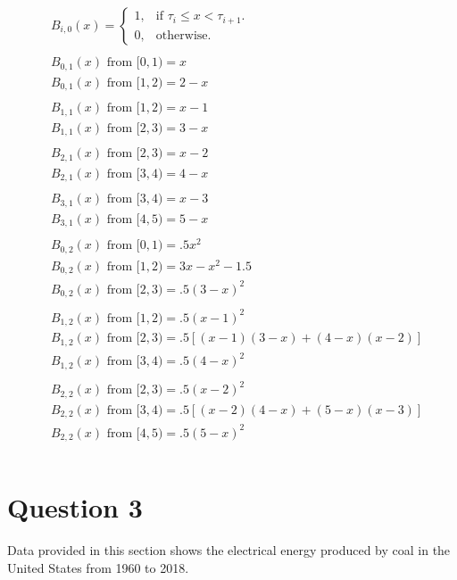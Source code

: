 \documentclass[12pt,letterpaper]{article}
\begin{document}
\begin{align*}
&B_{i,0}(x)=\begin{cases}
    1, & \text{if $\tau_i\leq x < \tau_{i+1}$}.\\
    0, & \text{otherwise}.
\end{cases}
\\ \\
&B_{0,1}(x)\mbox{ from } [0,1) = x \\
&B_{0,1}(x)\mbox{ from } [1,2) = 2-x \\ \\
&B_{1,1}(x)\mbox{ from } [1,2) = x-1 \\
&B_{1,1}(x)\mbox{ from } [2,3) = 3-x \\ \\
&B_{2,1}(x)\mbox{ from } [2,3) = x-2 \\
&B_{2,1}(x)\mbox{ from } [3,4) = 4-x \\ \\
&B_{3,1}(x)\mbox{ from } [3,4) = x-3 \\
&B_{3,1}(x)\mbox{ from } [4,5) = 5-x \\ \\
&B_{0,2}(x)\mbox{ from } [0,1) = .5x^2 \\
&B_{0,2}(x)\mbox{ from } [1,2) = 3x-x^2-1.5 \\
&B_{0,2}(x)\mbox{ from } [2,3) = .5(3-x)^2 \\ \\
&B_{1,2}(x)\mbox{ from } [1,2) = .5(x-1)^2 \\
&B_{1,2}(x)\mbox{ from } [2,3) = .5[(x-1)(3-x)+(4-x)(x-2)] \\
&B_{1,2}(x)\mbox{ from } [3,4) = .5(4-x)^2 \\ \\
&B_{2,2}(x)\mbox{ from } [2,3) = .5(x-2)^2 \\
&B_{2,2}(x)\mbox{ from } [3,4) = .5[(x-2)(4-x)+(5-x)(x-3)] \\
&B_{2,2}(x)\mbox{ from } [4,5) = .5(5-x)^2 \\ \\
\end{align*}

\section*{Question 3}
Data provided in this section shows the electrical energy produced by coal in the United States from 1960 to 2018.
\end{document}
